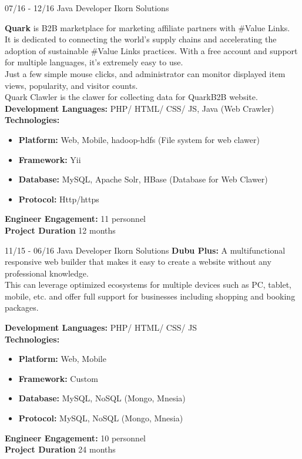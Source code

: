 \documentclass[]{friggeri-cv}
\begin{document}
\begin{entrylist}
\entry
    {07/16 - 12/16}
    {Java Developer}
    {Ikorn Solutions}
	{\textbf{ Quark}  is B2B marketplace for marketing affiliate partners with \#Value Links.\\ 
	It is dedicated to connecting the world’s supply chains and accelerating the adoption of sustainable \#Value Links practices.
	With a free account and support for multiple languages, it’s extremely easy to use.\\
	 Just a few simple mouse clicks, and administrator can monitor displayed item views, popularity, and visitor counts.\\
	Quark Clawler is the clawer for collecting data  for QuarkB2B website.\\

	 \textbf{Development Languages:} PHP/ HTML/ CSS/ JS, Java (Web Crawler) \\ 
	 \textbf{Technologies:}~
			\begin{itemize}
				\item \textbf{Platform:} Web,  Mobile, hadoop-hdfs (File system for web clawer)
				\item \textbf{Framework:} Yii
				\item \textbf{Database:} MySQL, Apache Solr, HBase (Database for Web Clawer)
				\item \textbf{Protocol:} Http/https
			\end{itemize}
		 \textbf{Engineer Engagement:} 11 personnel\\
		 \textbf{Project Duration} 12  months~
	}
\end{entrylist}

\begin{entrylist}
\entry
    {11/15 - 06/16}
    {Java Developer}
    {Ikorn Solutions}
	{\textbf{ Dubu Plus: } A multifunctional responsive web builder that makes it easy to create a website without any professional knowledge.
	\\ This can leverage optimized ecosystems for multiple devices such as PC, tablet, mobile, etc. and offer full support for businesses including shopping and booking packages.\\
}
\end{entrylist}

\begin{entrylist}
\entry
{}
{}
{}
{
		 \textbf{Development Languages:} PHP/ HTML/ CSS/ JS~\\
		 \textbf{Technologies:}~
			\begin{itemize}
				\item \textbf{Platform:} Web,  Mobile
				\item \textbf{Framework:} Custom
				\item \textbf{Database:} MySQL, NoSQL (Mongo, Mnesia)
				\item \textbf{Protocol:} MySQL, NoSQL (Mongo, Mnesia)
			\end{itemize}
		 \textbf{Engineer Engagement:} 10 personnel\\
		 \textbf{Project Duration} 24  months\\
	}
\end{entrylist}
\end{document}
